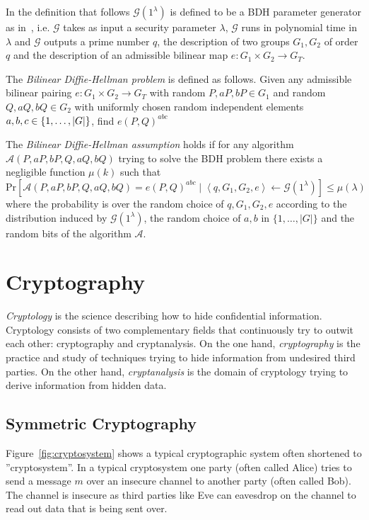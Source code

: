 In the definition that follows $\mathcal{G} \left( 1^{\lambda} \right)$ is defined to be a BDH parameter generator as in~\cite{art:BonehF01}, i.e. $\mathcal{G}$ takes as input a security parameter $\lambda$, $\mathcal{G}$ runs in polynomial time in $\lambda$ and $\mathcal{G}$ outputs a prime number $q$, the description of two groups $G_1, G_2$ of order $q$ and the description of an admissible bilinear map $e: G_1 \times G_2 \rightarrow G_T$.
\begin{defn}[BDH]
\label{def:bdh}
The \textit{Bilinear Diffie-Hellman problem} is defined as follows. Given any admissible bilinear pairing $e: G_1 \times G_2 \rightarrow G_T$ with random $P, aP, bP \in G_1$ and random $Q, aQ, bQ \in G_2$ with uniformly chosen random independent elements $a, b, c \medskip \in \{ 1, \ldots, | G |\}$, find $e \left( P, Q \right)^{abc}$

The \textit{Bilinear Diffie-Hellman assumption} holds if for any algorithm \\ $\mathcal{A} \left( P, aP, bP, Q, aQ, bQ \right)$ trying to solve the BDH problem there exists a negligible function $\mu \left( k \right)$ such that 
 \begin{equation*}
  \textrm{Pr} \left[ \mathcal{A} \left( P, aP, bP, Q, aQ, bQ \right) = e \left( P, Q \right)^{abc} \mid \left< q, G_1, G_2, e \right> \leftarrow \mathcal{G} \left( 1^{\lambda} \right)\right] \leq \mu \left( \lambda \right)
 \end{equation*}
 where the probability is over the random choice of $q, G_1, G_2, e$ according to the distribution induced by $\mathcal{G} \left( 1^{\lambda} \right)$, the random choice of $a, b$ in $\{ 1, \ldots, | G |\}$ and the random bits of the algorithm $\mathcal{A}$.
\end{defn}
\section{Cryptography}
\textit{Cryptology} is the science describing how to hide confidential information. Cryptology consists of two complementary fields that continuously try to outwit each other: cryptography and cryptanalysis. On the one hand, \textit{cryptography} is the practice and study of techniques trying to hide information from undesired third parties. On the other hand, \textit{cryptanalysis} is the domain of cryptology trying to derive information from hidden data.

\subsection{Symmetric Cryptography}
Figure~\ref{fig:cryptosystem} shows a typical cryptographic system often shortened to ''cryptosystem''. In a typical cryptosystem one party (often called Alice) tries to send a message $m$ over an insecure channel to another party (often called Bob). The channel is insecure as third parties like Eve can eavesdrop on the channel to read out data that is being sent over.

